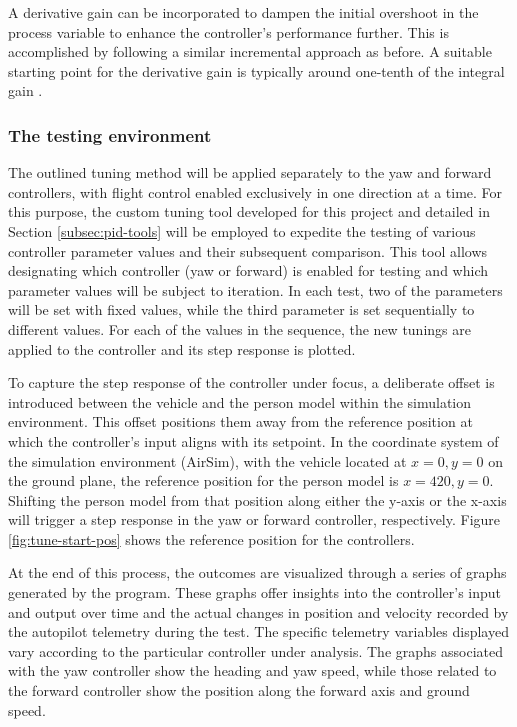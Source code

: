 A derivative gain can be incorporated to dampen the initial overshoot in the process variable to enhance the controller's performance further. This is accomplished by following a similar incremental approach as before. A suitable starting point for the derivative gain is typically around one-tenth of the integral gain \cite{pid-tuning}.


\subsubsection{The testing environment}

The outlined tuning method will be applied separately to the yaw and forward controllers, with flight control enabled exclusively in one direction at a time. For this purpose, the custom tuning tool developed for this project and detailed in Section \ref{subsec:pid-tools} will be employed to expedite the testing of various controller parameter values and their subsequent comparison. This tool allows designating which controller (yaw or forward) is enabled for testing and which parameter values will be subject to iteration. In each test, two of the parameters will be set with fixed values, while the third parameter is set sequentially to different values. For each of the values in the sequence, the new tunings are applied to the controller and its step response is plotted.

To capture the step response of the controller under focus, a deliberate offset is introduced between the vehicle and the person model within the simulation environment. This offset positions them away from the reference position at which the controller's input aligns with its setpoint. In the coordinate system of the simulation environment (AirSim), with the vehicle located at $x=0, y=0$ on the ground plane, the reference position for the person model is $x=420, y=0$. Shifting the person model from that position along either the y-axis or the x-axis will trigger a step response in the yaw or forward controller, respectively. Figure \ref{fig:tune-start-pos} shows the reference position for the controllers.

At the end of this process, the outcomes are visualized through a series of graphs generated by the program. These graphs offer insights into the controller's input and output over time and the actual changes in position and velocity recorded by the autopilot telemetry during the test. The specific telemetry variables displayed vary according to the particular controller under analysis. The graphs associated with the yaw controller show the heading and yaw speed, while those related to the forward controller show the position along the forward axis and ground speed.

